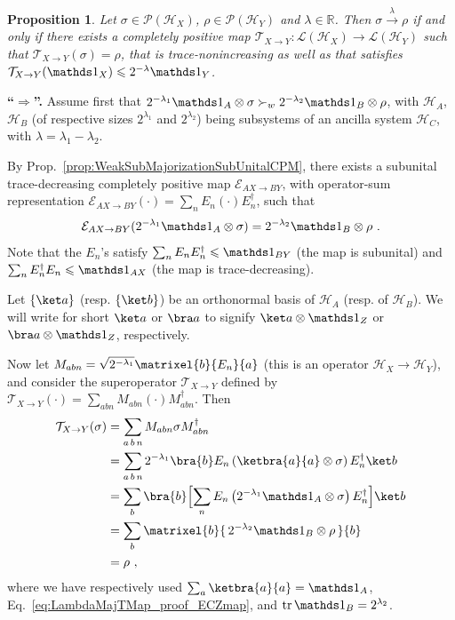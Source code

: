 \documentclass[10pt,letterpaper]{article}
\theoremstyle{plain}
\newtheorem{prop}[thm]{Proposition}
\def\Hs{\mathscr{H}}%
\newenvironment{myproof}[1][\proofname]{%
  \color{prooftextcolor} \footnotesize \proof[\itshape #1]\hspace*{1.2mm}%
}{\endproof}
\newcommand{\lambdamaj}[1]{\xrightarrow{#1}}
\newcommand{\LOps}{\mathscr{L}}
\newcommand{\POps}{\mathscr{P}}
\begin{document}
\begin{prop}
  \label{prop:LambdaMajorizationTMap}
  Let $\sigma\in\POps(\Hs_X)$, $\rho\in\POps(\Hs_Y)$ and $\lambda\in\mathbb R$. Then $\sigma\lambdamaj\lambda\rho$
  if and only if there exists a completely positive map
  $\mathcal T_{X\rightarrow Y} : \LOps(\Hs_X) \rightarrow \LOps(\Hs_Y)$ such
  that $\mathcal{T}_{X\rightarrow Y}(\sigma) = \rho$, that is trace-nonincreasing as well as that satisfies
  $\mathcal{T}_{X\rightarrow Y}(\Ident_X)\leqslant 2^{-\lambda}\Ident_Y$.
\end{prop}

\begin{myproof}[Proof of Prop.~\ref{prop:LambdaMajorizationTMap}]
  {\bf ``$\boldsymbol\Rightarrow$''.} \hspace*{1.5mm}
  Assume first that $2^{-\lambda_1}\Ident_A\otimes\sigma \succ_w 2^{-\lambda_2}\Ident_B\otimes\rho$, with
  $\Hs_A$, $\Hs_B$ (of respective sizes $2^{\lambda_1}$ and $2^{\lambda_2}$) being subsystems of an ancilla
  system $\Hs_C$, with $\lambda=\lambda_1-\lambda_2$.

  By Prop.~\ref{prop:WeakSubMajorizationSubUnitalCPM}, there exists a subunital trace-decreasing
  completely positive map $\mathcal{E}_{AX\rightarrow BY}$, with operator-sum representation
  $\mathcal{E}_{AX\rightarrow BY}(\cdot) = \sum_n E_n\left(\cdot\right)E_n^\dagger$, such that
  \begin{align}
    \label{eq:LambdaMajTMap_proof_ECZmap}
    \mathcal{E}_{AX\rightarrow BY}(2^{-\lambda_1}\Ident_A\otimes\sigma) = 2^{-\lambda_2}\Ident_B\otimes\rho\ .
  \end{align}
  Note that the $E_n$'s satisfy $\sum_n E_n E_n^\dagger \leqslant \Ident_{BY}$ (the map is subunital) and
  $\sum_n E_n^\dagger E_n \leqslant \Ident_{AX}$ (the map is trace-decreasing).

  Let $\{\ket a\}$ (resp. $\{\ket b\}$) be an orthonormal basis of $\Hs_A$ (resp. of $\Hs_B$). We will write
  for short $\ket a$ or $\bra a$ to signify $\ket a \otimes \Ident_Z$ or $\bra a \otimes \Ident_Z$, respectively.

  Now let $M_{abn} = \sqrt{2^{-\lambda_1}} \matrixel{b}{ E_n }{a}$ (this is an operator $\Hs_X\rightarrow\Hs_Y$),
  and consider the superoperator $\mathcal{T}_{X\rightarrow Y}$ defined by
  $\mathcal{T}_{X\rightarrow Y}(\cdot) = \sum_{abn} M_{abn}\left(\cdot\right)M_{abn}^\dagger$.
  Then
  \begin{align*}
    \mathcal{T}_{X\rightarrow Y}(\sigma) &= \sum_{a\,b\,n} M_{abn}\sigma M_{abn}^\dagger \\
    &= \sum_{a\,b\,n}  2^{-\lambda_1} \bra{b} E_n \left(\ketbra{a}{a}\otimes\sigma\right) E_n^\dagger \ket b \\
    &= \sum_{b}\bra{b} \Bigl[\sum_n E_n \left( 2^{-\lambda_1}\Ident_A\otimes\sigma\right) E_n^\dagger \Bigr] \ket b\\
    &= \sum_{b} \matrixel{b}{ \, 2^{-\lambda_2}\Ident_B\otimes\rho \, }{b} \\
    &= \rho\ ,
  \end{align*}
  where we have respectively used $\sum_a \ketbra{a}{a} = \Ident_A$, Eq.~\eqref{eq:LambdaMajTMap_proof_ECZmap},
  and $\tr \Ident_B = 2^{\lambda_2}$.


\end{myproof}
\end{document}
